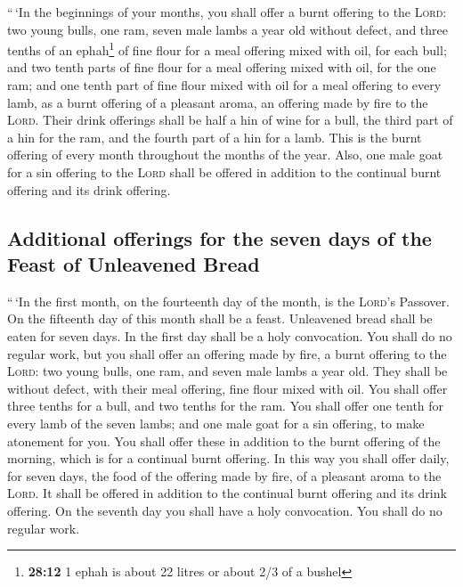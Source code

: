  ``\,`In the beginnings of your months, you shall offer a
burnt offering to the \textsc{Lord}: two young bulls, one ram, seven
male lambs a year old without defect,  and three tenths
of an ephah\footnote{\textbf{28:12} 1 ephah is about 22 litres or about
  2/3 of a bushel} of fine flour for a meal offering mixed with oil, for
each bull; and two tenth parts of fine flour for a meal offering mixed
with oil, for the one ram;  and one tenth part of fine
flour mixed with oil for a meal offering to every lamb, as a burnt
offering of a pleasant aroma, an offering made by fire to the
\textsc{Lord}.  Their drink offerings shall be half a hin
of wine for a bull, the third part of a hin for the ram, and the fourth
part of a hin for a lamb. This is the burnt offering of every month
throughout the months of the year.  Also, one male goat
for a sin offering to the \textsc{Lord} shall be offered in addition to
the continual burnt offering and its drink offering.

\hypertarget{additional-offerings-for-the-seven-days-of-the-feast-of-unleavened-bread}{%
\subsection{Additional offerings for the seven days of the Feast of
Unleavened
Bread}\label{additional-offerings-for-the-seven-days-of-the-feast-of-unleavened-bread}}

 ``\,`In the first month, on the fourteenth day of the
month, is the \textsc{Lord}'s Passover.  On the fifteenth
day of this month shall be a feast. Unleavened bread shall be eaten for
seven days.  In the first day shall be a holy
convocation. You shall do no regular work,  but you shall
offer an offering made by fire, a burnt offering to the \textsc{Lord}:
two young bulls, one ram, and seven male lambs a year old. They shall be
without defect,  with their meal offering, fine flour
mixed with oil. You shall offer three tenths for a bull, and two tenths
for the ram.  You shall offer one tenth for every lamb of
the seven lambs;  and one male goat for a sin offering,
to make atonement for you.  You shall offer these in
addition to the burnt offering of the morning, which is for a continual
burnt offering.  In this way you shall offer daily, for
seven days, the food of the offering made by fire, of a pleasant aroma
to the \textsc{Lord}. It shall be offered in addition to the continual
burnt offering and its drink offering.  On the seventh
day you shall have a holy convocation. You shall do no regular work.

